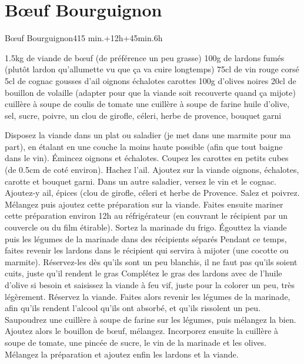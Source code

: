 {\section{Bœuf Bourguignon}
\begin{recette}{Bœuf Bourguignon}{4}{15 min.+12h+45min.}{6h}
\begin{ingredients}
\ingredient 1.5kg de viande de bœuf (de préférence un peu grasse)
\ingredient 100g de lardons fumés (plutôt lardon qu'allumette vu que ça va cuire longtemps)
\ingredient 75cl de vin rouge corsé
\ingredient 5cl de cognac
 gousses d'ail
 oignons
 échalotes
 carottes
\ingredient 100g d'olives noires
\ingredient 20cl de bouillon de volaille (adapter pour que la viande soit recouverte quand ça mijote)
 cuillère à soupe de coulis de tomate
\ingredient une cuillère à soupe de farine
\ingredient huile d'olive, sel, sucre, poivre, un clou de girofle, céleri, herbe de provence, bouquet garni
\end{ingredients}

\begin{preparation}
\etape Disposez la viande dans un plat ou saladier (je met dans une marmite pour ma part), en étalant en une couche la moins 
haute possible (afin que tout baigne dans le vin). 
\etape Émincez oignons et échalotes. Coupez les carottes en petits cubes (de 0.5cm de coté environ). Hachez l'ail. 
\etape Ajoutez sur la viande oignons, échalotes, carotte et bouquet garni. 
\etape Dans un autre saladier, versez le vin et le cognac. Ajoutez-y ail, épices (clou de girofle, céleri et herbe de 
Provence. Salez et poivrez. Mélangez puis ajoutez cette préparation sur la viande.
\etape Faites ensuite mariner cette préparation environ 12h au réfrigérateur (en couvrant le récipient par un couvercle ou du
film étirable). 
\etape Sortez la marinade du frigo. Égouttez la viande puis les légumes de la marinade dans des récipients séparés
\etape Pendant ce temps, faites revenir les lardons dans le récipient qui servira à mijoter (une cocotte ou marmite).
Réservez-les dès qu'ils sont un peu blanchis, il ne faut pas qu'ils soient cuits, juste qu'il rendent le gras
\etape Complétez le gras des lardons avec de l'huile d'olive si besoin et saisissez la viande à feu vif, juste pour la colorer
un peu, très légèrement. Réservez la viande. 
\etape Faites alors revenir les légumes de la marinade, afin qu'ils rendent l'alcool qu'ils ont absorbé, et qu'ils rissolent un
peu. 
\etape Saupoudrez une cuillère à soupe de farine sur les légumes, puis mélangez la bien. Ajoutez alors le bouillon de bœuf,
mélangez. 
\etape Incorporez ensuite la cuillère à soupe de tomate, une pincée de sucre, le vin de la marinade et les olives. 
\etape Mélangez la préparation et ajoutez enfin les lardons et la viande. 
\end{preparation}


\end{recette}}
